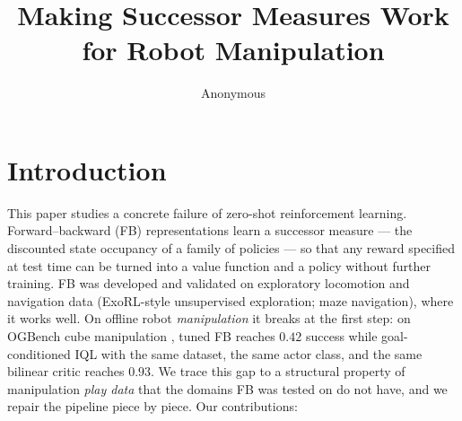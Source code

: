 \documentclass{article}
\title{Making Successor Measures Work for Robot Manipulation}
\author{Anonymous}
\begin{document}
\maketitle

\section{Introduction}
\label{sec:introduction}

This paper studies a concrete failure of zero-shot reinforcement learning.
Forward--backward (FB) representations \citep{touati2021learning,touati2023does}
learn a successor measure --- the discounted state occupancy of a family of
policies --- so that any reward specified at test time can be turned into a
value function and a policy without further training. FB was developed and
validated on exploratory locomotion and navigation data (ExoRL-style
unsupervised exploration; maze navigation), where it works well. On offline
robot \emph{manipulation} it breaks at the first step: on OGBench cube
manipulation \citep{park2024ogbench}, tuned FB reaches $0.42$ success while
goal-conditioned IQL \citep{kostrikov2021offline} with the same dataset, the
same actor class, and the same bilinear critic reaches $0.93$. We trace this
gap to a structural property of manipulation \emph{play data} that the domains
FB was tested on do not have, and we repair the pipeline piece by piece. Our
contributions:
\end{document}
